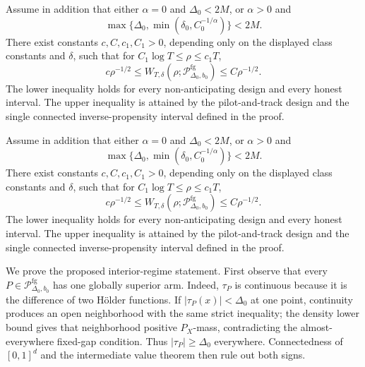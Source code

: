 Assume in addition that either \(\alpha=0\) and \(\Delta_0<2M\), or \(\alpha>0\) and
\[
\max\{\Delta_0,\min(\delta_0,C_0^{-1/\alpha})\}<2M.
\]
There exist constants \(c,C,c_1,C_1>0\), depending only on the displayed class constants and \(\delta\), such that for \(C_1\log T\leq\rho\leq c_1T\),
\[
c\rho^{-1/2}\leq W_{T,\delta}(\rho;\mathcal P_{\Delta_0,b_0}^{\mathrm{fg}})\leq C\rho^{-1/2}.
\]
The lower inequality holds for every non-anticipating design and every honest interval.  The upper inequality is attained by the pilot-and-track design and the single connected inverse-propensity interval defined in the proof.

Assume in addition that either \(\alpha=0\) and \(\Delta_0<2M\), or \(\alpha>0\) and
\[
\max\{\Delta_0,\min(\delta_0,C_0^{-1/\alpha})\}<2M.
\]
There exist constants \(c,C,c_1,C_1>0\), depending only on the displayed class constants and \(\delta\), such that for \(C_1\log T\leq\rho\leq c_1T\),
\[
c\rho^{-1/2}\leq W_{T,\delta}(\rho;\mathcal P_{\Delta_0,b_0}^{\mathrm{fg}})\leq C\rho^{-1/2}.
\]
The lower inequality holds for every non-anticipating design and every honest interval.  The upper inequality is attained by the pilot-and-track design and the single connected inverse-propensity interval defined in the proof.

We prove the proposed interior-regime statement.  First observe that every \(P\in\mathcal P_{\Delta_0,b_0}^{\mathrm{fg}}\) has one globally superior arm.  Indeed, \(\tau_P\) is continuous because it is the difference of two H\"older functions.  If \(|\tau_P(x)|<\Delta_0\) at one point, continuity produces an open neighborhood with the same strict inequality; the density lower bound gives that neighborhood positive \(P_X\)-mass, contradicting the almost-everywhere fixed-gap condition.  Thus \(|\tau_P|\geq\Delta_0\) everywhere.  Connectedness of \([0,1]^d\) and the intermediate value theorem then rule out both signs.

